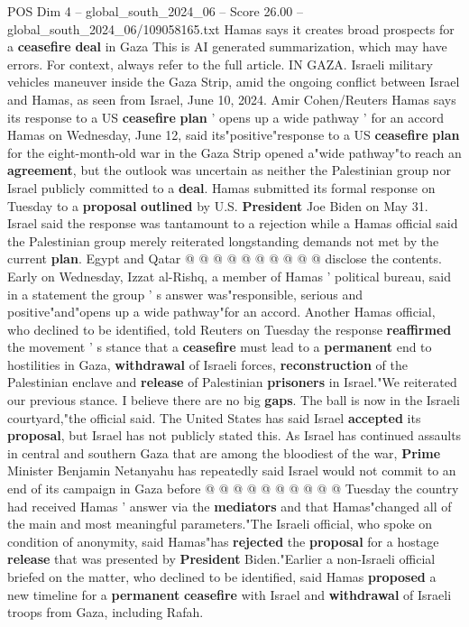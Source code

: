 \begin{textsample}{POS Dim 4 – global\_south\_2024\_06 – Score 26.00 – global\_south\_2024\_06/109058165.txt}  \label{ex:f4_pos_083}
Hamas says it creates broad prospects for a \textbf{ceasefire} \textbf{deal} in Gaza This is AI generated summarization, which may have errors.
For context, always refer to the full article.
IN GAZA.
Israeli military vehicles maneuver inside the Gaza Strip, amid the ongoing conflict between Israel and Hamas, as seen from Israel, June 10, 2024.
Amir Cohen/Reuters Hamas says its response to a US \textbf{ceasefire} \textbf{plan} ' opens up a wide pathway ' for an accord Hamas on Wednesday, June 12, said its"positive"response to a US \textbf{ceasefire} \textbf{plan} for the eight-month-old war in the Gaza Strip opened a"wide pathway"to reach an \textbf{agreement}, but the outlook was uncertain as neither the Palestinian group nor Israel publicly committed to a \textbf{deal}.
Hamas submitted its formal response on Tuesday to a \textbf{proposal} \textbf{outlined} by U.S. \textbf{President} Joe Biden on May 31.
Israel said the response was tantamount to a rejection while a Hamas official said the Palestinian group merely reiterated longstanding demands not met by the current \textbf{plan}.
Egypt and Qatar @ @ @ @ @ @ @ @ @ @ disclose the contents.
Early on Wednesday, Izzat al-Rishq, a member of Hamas ' political bureau, said in a statement the group ' s answer was"responsible, serious and positive"and"opens up a wide pathway"for an accord.
Another Hamas official, who declined to be identified, told Reuters on Tuesday the response \textbf{reaffirmed} the movement ' s stance that a \textbf{ceasefire} must lead to a \textbf{permanent} end to hostilities in Gaza, \textbf{withdrawal} of Israeli forces, \textbf{reconstruction} of the Palestinian enclave and \textbf{release} of Palestinian \textbf{prisoners} in Israel."We reiterated our previous stance.
I believe there are no big \textbf{gaps}.
The ball is now in the Israeli courtyard,"the official said.
The United States has said Israel \textbf{accepted} its \textbf{proposal}, but Israel has not publicly stated this.
As Israel has continued assaults in central and southern Gaza that are among the bloodiest of the war, \textbf{Prime} Minister Benjamin Netanyahu has repeatedly said Israel would not commit to an end of its campaign in Gaza before @ @ @ @ @ @ @ @ @ @ Tuesday the country had received Hamas ' answer via the \textbf{mediators} and that Hamas"changed all of the main and most meaningful parameters."The Israeli official, who spoke on condition of anonymity, said Hamas"has \textbf{rejected} the \textbf{proposal} for a hostage \textbf{release} that was presented by \textbf{President} Biden."Earlier a non-Israeli official briefed on the matter, who declined to be identified, said Hamas \textbf{proposed} a new timeline for a \textbf{permanent} \textbf{ceasefire} with Israel and \textbf{withdrawal} of Israeli troops from Gaza, including Rafah.

\end{textsample}
